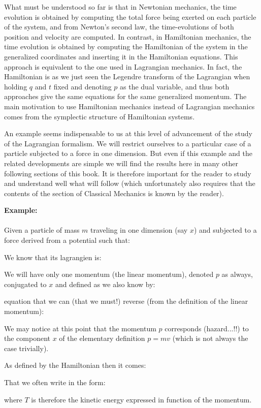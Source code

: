 	What must be understood so far is that in Newtonian mechanics, the time evolution is obtained by computing the total force being exerted on each particle of the system, and from Newton's second law, the time-evolutions of both position and velocity are computed. In contrast, in Hamiltonian mechanics, the time evolution is obtained by computing the Hamiltonian of the system in the generalized coordinates and inserting it in the Hamiltonian equations. This approach is equivalent to the one used in Lagrangian mechanics. In fact, the Hamiltonian is as we just seen the Legendre transform of the Lagrangian when holding $q$ and $t$ fixed and denoting $p$ as the dual variable, and thus both approaches give the same equations for the same generalized momentum. The main motivation to use Hamiltonian mechanics instead of Lagrangian mechanics comes from the symplectic structure of Hamiltonian systems.
	
	An example seems indispensable to us at this level of advancement of the study of the Lagrangian formalism. We will restrict ourselves to a particular case of a particle subjected to a force in one dimension. But even if this example and the related developments are simple we will find the results here in many other following sections of this book. It is therefore important for the reader to study and understand well what will follow (which unfortunately also requires that the contents of the section of Classical Mechanics is known by the reader).
	
	\begin{tcolorbox}[colframe=black,colback=white,sharp corners]
	\textbf{{\Large {}}Example:}\\\\
	Given a particle of mass $m$ traveling in one dimension (say $x$) and subjected to a force derived from a potential such that:
	
	We know that its lagrangien is:
	
	We will have only one momentum (the linear momentum), denoted $p$ as always, conjugated to $x$ and defined as we also know by:
	
	equation that we can (that we must!) reverse (from the definition of the linear momentum):
	
	We may notice at this point that the momentum $p$ corresponds (hazard...!!) to the component $x$ of the elementary definition $p=mv$ (which is not always the case trivially).
	
	As defined by the Hamiltonian then it comes:
	
	That we often write in the form:
	
	where $T$ is therefore the kinetic energy expressed in function of the momentum.
	\end{tcolorbox}
	
